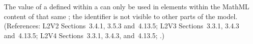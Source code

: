 The  value of a \Parameter defined within a \KineticLaw
can only be used in  elements within the MathML content
of that same \KineticLaw; the identifier is not visible to other
parts of the model.  (References: L2V2 Sections~3.4.1, 3.5.3 
and~4.13.5; L2V3 Sections~3.3.1, 3.4.3 and~4.13.5; L2V4 Sections~3.3.1, 3.4.3, and~4.13.5; .)
